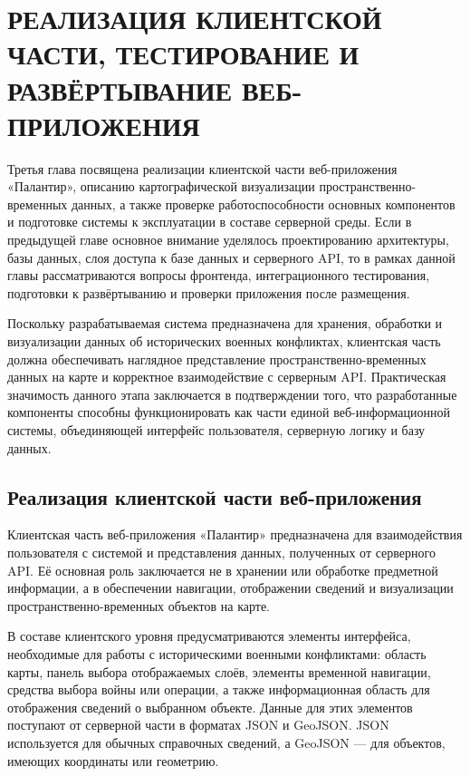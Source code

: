 \chapter{РЕАЛИЗАЦИЯ КЛИЕНТСКОЙ ЧАСТИ, ТЕСТИРОВАНИЕ И РАЗВЁРТЫВАНИЕ ВЕБ-ПРИЛОЖЕНИЯ}

Третья глава посвящена реализации клиентской части веб-приложения «Палантир», описанию картографической визуализации пространственно-временных данных, а также проверке работоспособности основных компонентов и подготовке системы к эксплуатации в составе серверной среды. Если в предыдущей главе основное внимание уделялось проектированию архитектуры, базы данных, слоя доступа к базе данных и серверного API, то в рамках данной главы рассматриваются вопросы фронтенда, интеграционного тестирования, подготовки к развёртыванию и проверки приложения после размещения.

Поскольку разрабатываемая система предназначена для хранения, обработки и визуализации данных об исторических военных конфликтах, клиентская часть должна обеспечивать наглядное представление пространственно-временных данных на карте и корректное взаимодействие с серверным API. Практическая значимость данного этапа заключается в подтверждении того, что разработанные компоненты способны функционировать как части единой веб-информационной системы, объединяющей интерфейс пользователя, серверную логику и базу данных.

\section{Реализация клиентской части веб-приложения}

Клиентская часть веб-приложения «Палантир» предназначена для взаимодействия пользователя с системой и представления данных, полученных от серверного API. Её основная роль заключается не в хранении или обработке предметной информации, а в обеспечении навигации, отображении сведений и визуализации пространственно-временных объектов на карте.

В составе клиентского уровня предусматриваются элементы интерфейса, необходимые для работы с историческими военными конфликтами: область карты, панель выбора отображаемых слоёв, элементы временной навигации, средства выбора войны или операции, а также информационная область для отображения сведений о выбранном объекте. Данные для этих элементов поступают от серверной части в форматах JSON и GeoJSON. JSON используется для обычных справочных сведений, а GeoJSON --- для объектов, имеющих координаты или геометрию.

